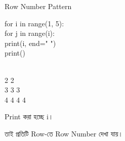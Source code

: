 \begin{codeoutputbox}{Row Number Pattern}

\noindent
\begin{minipage}[t]{0.53\linewidth}
\codeheading

\begin{english}
\ttfamily
for i in range(1, 5):\\
\hspace*{4mm}for j in range(i):\\
\hspace*{8mm}print(i, end=" ")\\
\hspace*{4mm}print()
\end{english}

\end{minipage}
\hfill
\begin{minipage}[t]{0.43\linewidth}
\outputheading

\begin{english}
\\
2 2\\
3 3 3\\
4 4 4 4
\end{english}

\medskip

Print করা হচ্ছে
\textenglish{\ttfamily i}।

তাই প্রতিটি Row-তে Row Number দেখা যায়।

\end{minipage}

\end{codeoutputbox}



